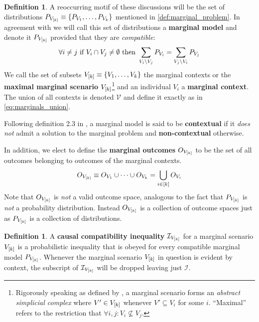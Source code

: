 \documentclass[aps, 10pt, english, twoside, pra, nofootinbib, longbibliography]{revtex4-1}
\theoremstyle{plain}
\theoremstyle{definition}
\newtheorem{definition}[theorem]{Definition}
\theoremstyle{remark}
\newcommand{\term}[1]{\textcolor{Mahogany}{\textbf{#1}}}
\newcommand{\outc}[1]{o\!\bs{#1}} %
\begin{document}
    \begin{definition}
        \label{def:marginal_model}
        A reoccurring motif of these discussions will be the set of distributions $\prob[V_{\bs{k}}] \defined \bc{\prob[V_1], \ldots, \prob[V_k]}$ mentioned in \cref{def:marginal_problem}. In agreement with \cite{Fritz_2011} we will call this set of distributions a \term{marginal model} and denote it $\prob_{V_{\bs{k}}}$ provided that they are \textit{compatible}:
        \[ \forall i \neq j \text{ if } V_i \cap V_j \neq \emptyset \text{ then } \sum_{V_i \setminus V_j} \prob[V_i] = \sum_{V_j \setminus V_i} \prob[V_j]  \]
        We call the set of subsets $V_{\left[ k \right]} \equiv \left\{ V_1, \ldots, V_k \right\}$ the marginal contexts or the \term{maximal marginal scenario} $V_{\left[ k \right]}$\footnote{Rigorously speaking as defined by \cite{Fritz_2011}, a marginal scenario forms an \textit{abstract simplicial complex} where $V' \in V_{\left[ k \right]}$ whenever $V' \subseteq V_i$ for some $i$. ``Maximal'' refers to the restriction that $\forall i,j : V_i \not \subseteq V_j$.} and an individual $V_i$ a \term{marginal context}. The union of all contexts is denoted $\mathcal{V}$ and define it exactly as in \cref{eq:marginals_union}.

        Following definition 2.3 in \cite{Fritz_2011}, a marginal model is said to be \term{contextual} if it \textit{does not} admit a solution to the marginal problem and \term{non-contextual} otherwise.

        In addition, we elect to define the \term{marginal outcomes} $O_{V_{\left[ k \right]}}$ to be the set of all outcomes belonging to outcomes of the marginal contexts.
        \[ O_{V_{\left[ k \right]}} \equiv O_{V_1} \cup \cdots \cup O_{V_k} = \bigcup_{i \in \left[ k \right]} O_{V_i} \]
        Note that $O_{V_{\left[ k \right]}}$ is \textit{not} a valid outcome space, analogous to the fact that $P_{V_{\left[ k \right]}}$ is \textit{not} a probability distribution. Instead $O_{V_{\left[ k \right]}}$ is a collection of outcome spaces just as $P_{V_{\left[ k \right]}}$ is a collection of distributions.
    \end{definition}

    \begin{definition}
        A \term{causal compatibility inequality} $\mathcal{I}_{V_{\left[ k \right]}}$ for a marginal scenario $V_{\left[ k \right]}$ is a probabilistic inequality that is obeyed for every compatible marginal model $\prob_{V_{\bs{k}}}$. Whenever the marginal scenario $V_{\left[ k \right]}$ in question is evident by context, the subscript of $\mathcal{I}_{V_{\left[ k \right]}}$ will be dropped leaving just $\mathcal{I}$.
    \end{definition}
\end{document}

